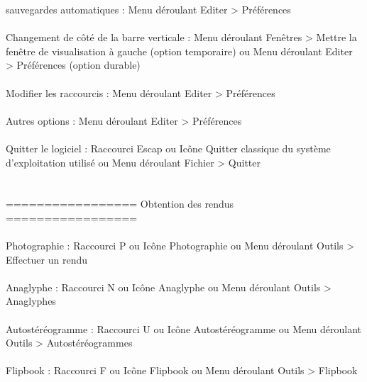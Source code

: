 	 sauvegardes automatiques :	Menu déroulant Editer > Préférences
\\ \\
Changement de côté de la barre 
	 verticale :			Menu déroulant Fenêtres > Mettre la fenêtre de visualisation à gauche (option temporaire)
	 	   			ou     Menu déroulant Editer > Préférences (option durable)
\\ \\
Modifier les raccourcis :		Menu déroulant Editer > Préférences
\\ \\
Autres options :			Menu déroulant Editer > Préférences
\\ \\
Quitter le logiciel :			Raccourci Escap
	   	    			ou Icône Quitter classique du système d'exploitation utilisé
					ou Menu déroulant Fichier > Quitter
\\ \\ \\
================= Obtention des rendus =================
\\ \\
Photographie :	  	    	        Raccourci P
	     				ou     Icône Photographie
					ou     Menu déroulant Outils > Effectuer un rendu
\\ \\
Anaglyphe :	  	    	        Raccourci N
	     				ou     Icône Anaglyphe
					ou     Menu déroulant Outils > Anaglyphes
\\ \\
Autostéréogramme :	  	    	Raccourci U
	     				ou     Icône Autostéréogramme
					ou     Menu déroulant Outils > Autostéréogrammes
\\ \\
Flipbook :	  	    	        Raccourci F
	     				ou     Icône Flipbook
					ou     Menu déroulant Outils > Flipbook
